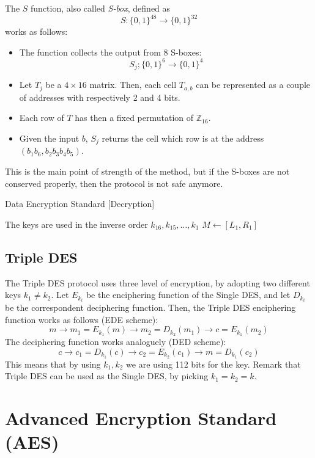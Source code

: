 The $S$ function, also called \emph{S-box}, defined as
\[S: \{0,1\}^{48} \rightarrow \{0,1\}^{32}\]
works as follows:
\begin{itemize}
    \item The function collects the output from 8 S-boxes:
    \[S_{j}; \{0,1\}^{6} \rightarrow \{0,1\}^{4}\]
    \item Let $T_{j}$ be a $4 \times 16$ matrix. Then, each cell $T_{a,b}$ can be represented as a couple of addresses with respectively 2 and 4 bits.
    \item Each row of $T$ has then a fixed permutation of $\mathbb{Z}_{16}$.
    \item Given the input $b$, $S_{j}$ returns the cell which row is at the address $(b_{1}b_{6}, b_{2}b_{3}b_{4}b_{5})$.
\end{itemize}
This is the main point of strength of the method, but if the S-boxes are not conserved properly, then the protocol is not safe anymore.

\begin{algorithm}
\caption{Data Encryption Standard [Decryption]}\label{alg:DES_decrypt}
The keys are used in the inverse order $k_{16}, k_{15}, \dots, k_{1}$\;
$M \gets [L_{1}, R_{1}]$\;
\end{algorithm}

\subsection{Triple DES}
The Triple DES protocol uses three level of encryption, by adopting two different keys $k_{1} \neq k_{2}$.\newline
Let $E_{k_{i}}$ be the enciphering function of the Single DES, and let $D_{k_{i}}$ be the correspondent deciphering function. Then, the Triple DES enciphering function works as follows (EDE scheme):
\[m \rightarrow m_{1} = E_{k_{1}}(m) \rightarrow m_{2} = D_{k_{2}}(m_{1}) \rightarrow c = E_{k_{1}}(m_{2})\]
The deciphering function works analoguely (DED scheme):
\[c \rightarrow c_{1} = D_{k_{1}}(c) \rightarrow c_{2} = E_{k_{2}}(c_{1}) \rightarrow m = D_{k_{1}}(c_{2})\]
This means that by using $k_{1}, k_{2}$ we are using 112 bits for the key. \newline
Remark that Triple DES can be used as the Single DES, by picking $k_{1} = k_{2} = k$.

\section{Advanced Encryption Standard (AES)}
